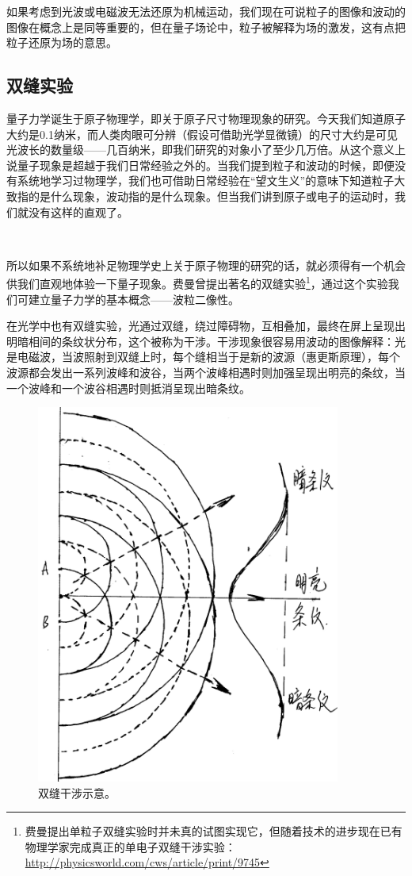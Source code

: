 如果考虑到光波或电磁波无法还原为机械运动，我们现在可说粒子的图像和波动的图像在概念上是同等重要的，但在量子场论中，粒子被解释为场的激发，这有点把粒子还原为场的意思。

\subsection{双缝实验}

量子力学诞生于原子物理学，即关于原子尺寸物理现象的研究。今天我们知道原子大约是0.1纳米，而人类肉眼可分辨（假设可借助光学显微镜）的尺寸大约是可见光波长的数量级——几百纳米，即我们研究的对象小了至少几万倍。从这个意义上说量子现象是超越于我们日常经验之外的。当我们提到粒子和波动的时候，即便没有系统地学习过物理学，我们也可借助日常经验在“望文生义”的意味下知道粒子大致指的是什么现象，波动指的是什么现象。但当我们讲到原子或电子的运动时，我们就没有这样的直观了。

~

所以如果不系统地补足物理学史上关于原子物理的研究的话，就必须得有一个机会供我们直观地体验一下量子现象。费曼曾提出著名的双缝实验\footnote{费曼提出单粒子双缝实验时并未真的试图实现它，但随着技术的进步现在已有物理学家完成真正的单电子双缝干涉实验：\url{http://physicsworld.com/cws/article/print/9745}}，通过这个实验我们可建立量子力学的基本概念——波粒二像性。

在光学中也有双缝实验，光通过双缝，绕过障碍物，互相叠加，最终在屏上呈现出明暗相间的条纹状分布，这个被称为干涉。干涉现象很容易用波动的图像解释：光是电磁波，当波照射到双缝上时，每个缝相当于是新的波源（惠更斯原理），每个波源都会发出一系列波峰和波谷，当两个波峰相遇时则加强呈现出明亮的条纹，当一个波峰和一个波谷相遇时则抵消呈现出暗条纹。

\begin{figure}[htbp]
\begin{center}
\includegraphics[width=10cm]{QuantumIntro/doubleslit.png}
\caption{双缝干涉示意。}
\end{center}
\end{figure}


